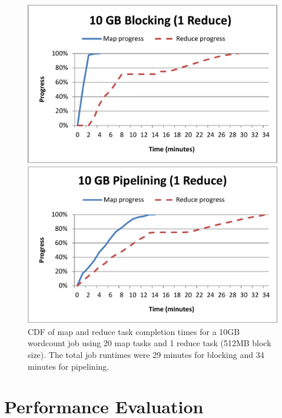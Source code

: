 \begin{figure}[t]
\begin{minipage}{0.5\linewidth}
  \centering
        \includegraphics[width=0.95\linewidth]{figures/wc_10gb_20m1r_blocking}
\end{minipage}
\begin{minipage}{0.5\linewidth}
  \centering
        \includegraphics[width=0.95\linewidth]{figures/wc_10gb_20m1r_pipeline}
\end{minipage}
\caption{CDF of map and reduce task completion times for a 10GB wordcount job
  using 20 map tasks and 1 reduce task (512MB block size). The total job
  runtimes were 29 minutes for blocking and 34 minutes for pipelining.}
\label{fig:wc3}
\vspace{-4pt}
\end{figure}

\section{Performance Evaluation}
\label{sec:perf}

